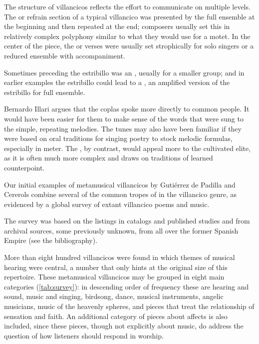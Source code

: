 The structure of villancicos reflects the effort to communicate on multiple
levels.
The  or refrain section of a typical villancico was presented
by the full ensemble at the beginning and then repeated at the end; composers
usually set this in relatively complex polyphony similar to what they would use
for a motet.
In the center of the piece, the  or verses were usually set
strophically for solo singers or a reduced ensemble with accompaniment.%
\begin{Footnote}
    Sometimes preceding the estribillo was an , usually for
    a smaller group; and in earlier examples the estribillo could lead to a
    , an amplified version of the estribillo for full
    ensemble.
\end{Footnote}
Bernardo Illari argues that the coplas spoke more directly to common people.%
    \Autocite{Illari:Popular}
It would have been easier for them to make sense of the words that were sung to
the simple, repeating melodies.
The tunes may also have been familiar if they were based on oral traditions for
singing poetry to stock melodic formulas, especially in  meter.
The , by contrast, would appeal more to the cultivated elite,
as it is often much more complex and draws on traditions of learned
counterpoint.

Our initial examples of metamusical villancicos by Gutiérrez de Padilla and
Cererols combine several of the common tropes of  in
the villancico genre, as evidenced by a global survey of extant villancico
poems and music.%
\begin{Footnote}
    The survey was based on the listings in catalogs and published studies and
    from archival sources, some previously unknown, from all over the former
    Spanish Empire (see the bibliography).
\end{Footnote}
More than eight hundred villancicos were found in which themes of musical
hearing were central, a number that only hints at the original size of this
repertoire.
These metamusical villancicos may be grouped in eight main categories
(\cref{tab:survey}): in descending order of frequency these are hearing and
sound, music and singing, birdsong, dance, musical instruments, angelic
musicians, music of the heavenly spheres, and pieces that treat the
relationship of sensation and faith.
An additional category of pieces about affects is also included, since these
pieces, though not explicitly about music, do address the question of how
listeners should respond in worship. 


